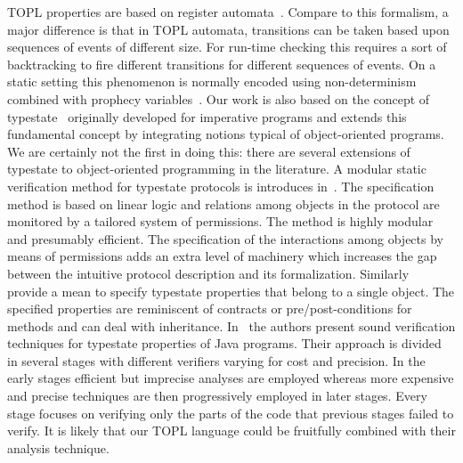 \documentclass{sigplanconf}[10pt] %
\begin{document}
TOPL properties are based on register automata~\cite{DBLP:journals/tocl/DemriL09}.
Compare to this formalism, a major difference is that in TOPL automata, transitions can be taken based upon sequences of events of different size.
For run-time checking this requires a sort of backtracking to fire different transitions for different  sequences of events.
On a static setting this phenomenon is normally encoded using non-determinism combined with prophecy variables~\cite{dblp:journals/tcs/abadil91}.
Our work is also based on the concept of typestate~\cite{strom1986} originally developed for imperative programs and extends this fundamental concept by integrating notions typical of object-oriented programs.
We are certainly not the first in doing this: there are several extensions of typestate to object-oriented programming in the literature.
A modular static verification method for typestate protocols is introduces in~\cite{dblp:conf/oopsla/bierhoffa07}.
The specification method is based on linear logic and relations among objects in the protocol are monitored by a tailored system of permissions.
The method is highly modular and presumably efficient.
The specification of the interactions among objects by means of permissions adds an extra level of machinery which increases the gap between the intuitive protocol description and its formalization.
Similarly~\cite{deline2004,dblp:conf/sigsoft/BierhoffA05} provide a mean to specify typestate properties that belong to a single object.
The specified properties are reminiscent of contracts or pre/post-conditions for methods and can deal with inheritance.
In~\cite{dblp:conf/issta/FinkYDRG06} the authors present sound verification techniques for typestate properties of Java  programs.
Their approach is divided in several stages with different verifiers varying for cost and precision.
In the early stages efficient but imprecise analyses are employed whereas more expensive and precise techniques are then progressively employed in later stages.
Every stage focuses on verifying only the parts of the code that previous stages failed to verify.
It is likely that our TOPL language could be fruitfully combined with their analysis technique.
\end{document}
